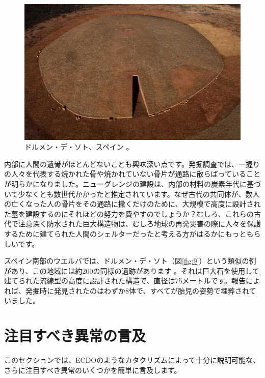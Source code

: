 \documentclass[10pt,twocolumn,letterpaper]{article}
\begin{document}
\begin{figure}[b]
\begin{center}
   \includegraphics[width=1\linewidth]{dolmen.jpg}
\end{center}
   \caption{ドルメン・デ・ソト、スペイン \cite{53}。}
\label{fig:9}
\label{fig:onecol}
\end{figure}

内部に人間の遺骨がほとんどないことも興味深い点です。発掘調査では、一握りの人々を代表する焼かれた骨や焼かれていない骨片が通路に散らばっていることが明らかになりました。ニューグレンジの建設は、内部の材料の炭素年代に基づいて少なくとも数世代かかったと推定されています。なぜ古代の共同体が、数人の亡くなった人の骨片をその通路に撒くだけのために、大規模で高度に設計された墓を建設するのにそれほどの努力を費やすのでしょうか？むしろ、これらの古代で注意深く防水された巨大構造物は、むしろ地球の再発災害の際に人々を保護するために建てられた人間のシェルターだったと考える方がはるかにもっともらしいです。

スペイン南部のウエルバでは、ドルメン・デ・ソト（図\ref{fig:9}）という類似の例があり、この地域には約200の同様の遺跡があります \cite{72,32} 。それは巨大石を使用して建てられた流線型の高度に設計された構造で、直径は75メートルです。報告によれば、発掘時に発見されたのはわずか8体で、すべてが胎児の姿勢で埋葬されていました。

\section{注目すべき異常の言及}

このセクションでは、ECDOのようなカタクリズムによって十分に説明可能な、さらに注目すべき異常のいくつかを簡単に言及します。
\end{document}
